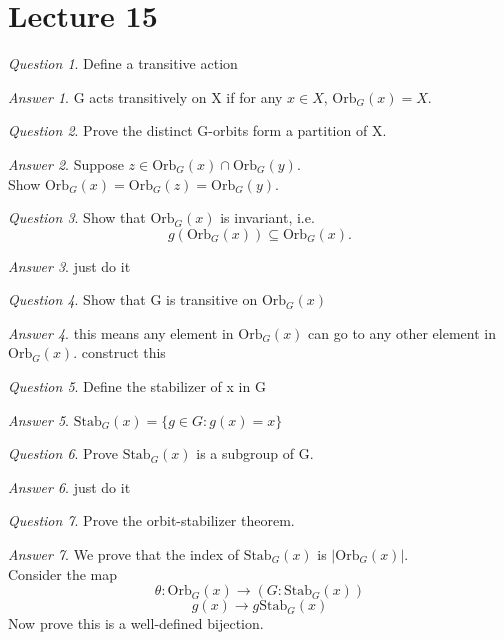 \documentclass[]{article}
\theoremstyle{remark}
\theoremstyle{qnstyle}
\newtheorem{question}{Question}
\theoremstyle{answerstyle}
\newtheorem*{answer}{Answer}
\begin{document}
\section*{Lecture 15}
{
    \begin{question}
        Define a transitive action
    \end{question}
    \begin{answer}
        G acts transitively on X if for any $x \in X$, $\text{Orb}_G(x) = X$.
    \end{answer}
}
{
    \begin{question}
        Prove the distinct G-orbits form a partition of X.
    \end{question}
    \begin{answer}
        Suppose $z \in \text{Orb}_G(x) \cap \text{Orb}_G(y)$.\\
        Show $ \text{Orb}_G(x) = \text{Orb}_G(z) = \text{Orb}_G(y)$.
    \end{answer}
}
{
    \begin{question}
        Show that $\text{Orb}_G(x)$ is invariant, i.e. 
        $$g(\text{Orb}_G(x)) \subseteq \text{Orb}_G(x).$$
    \end{question}
    \begin{answer}
        just do it
    \end{answer}
}
{
    \begin{question}
        Show that G is transitive on $\text{Orb}_G(x)$
    \end{question}
    \begin{answer}
        this means any element in $\text{Orb}_G(x)$ can go to any other element in $\text{Orb}_G(x)$. construct this
    \end{answer}
}
{
    \begin{question}
        Define the stabilizer of x in G
    \end{question}
    \begin{answer}
         $\text{Stab}_G(x) = \{g \in G: g(x) = x\}$
    \end{answer}  
}
{
    \begin{question}
        Prove $\text{Stab}_G(x)$ is a subgroup of G.
    \end{question}
    \begin{answer}
        just do it
    \end{answer}  
}
{
    \begin{question}
        Prove the orbit-stabilizer theorem.
    \end{question}
    \begin{answer}
        We prove that the index of $\text{Stab}_G(x)$ is $| \text{Orb}_G(x)|$. \\
        Consider the map
        $$\theta: \text{Orb}_G(x) \to (G:\text{Stab}_G(x))$$
        $$g(x) \to g \text{Stab}_G(x)$$
        Now prove this is a well-defined bijection.
    \end{answer}  
}
\end{document}
